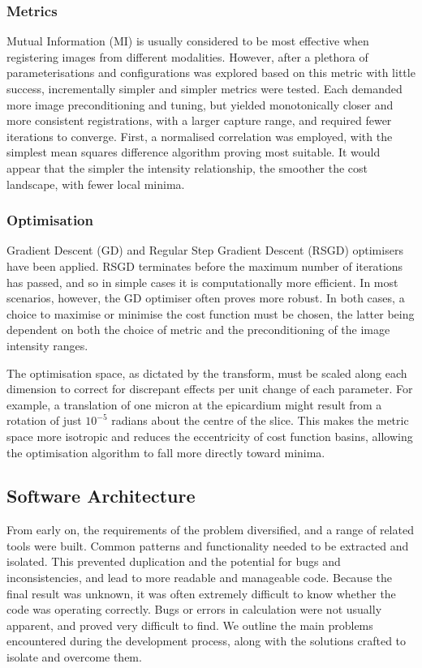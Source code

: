     \subsubsection{Metrics} %
    \label{ssub:metrics}
      Mutual Information (MI) is usually considered to be most effective when registering images from different modalities. However, after a plethora of parameterisations and configurations was explored based on this metric with little success, incrementally simpler and simpler metrics were tested. Each demanded more image preconditioning and tuning, but yielded monotonically closer and more consistent registrations, with a larger capture range, and required fewer iterations to converge. First, a normalised correlation was employed, with the simplest mean squares difference algorithm proving most suitable. It would appear that the simpler the intensity relationship, the smoother the cost landscape, with fewer local minima.
  
    \subsubsection{Optimisation} %
    \label{ssub:optimisation}
      Gradient Descent (GD) and Regular Step Gradient Descent (RSGD) optimisers have been applied. RSGD terminates before the maximum number of iterations has passed, and so in simple cases it is computationally more efficient. In most scenarios, however, the GD optimiser often proves more robust. In both cases, a choice to maximise or minimise the cost function must be chosen, the latter being dependent on both the choice of metric and the preconditioning of the image intensity ranges.

      The optimisation space, as dictated by the transform, must be scaled along each dimension to correct for discrepant effects per unit change of each parameter. For example, a translation of one micron at the epicardium might result from a rotation of just $10^{-5}$ radians about the centre of the slice. This makes the metric space more isotropic and reduces the eccentricity of cost function basins, allowing the optimisation algorithm to fall more directly toward minima.
    
  \subsection{Software Architecture} %
  \label{sub:software_architecture}
		From early on, the requirements of the problem diversified, and a range of related tools were built. Common patterns and functionality needed to be extracted and isolated. This prevented duplication and the potential for bugs and inconsistencies, and lead to more readable and manageable code. Because the final result was unknown, it was often extremely difficult to know whether the code was operating correctly. Bugs or errors in calculation were not usually apparent, and proved very difficult to find. We outline the main problems encountered during the development process, along with the solutions crafted to isolate and overcome them.
		
